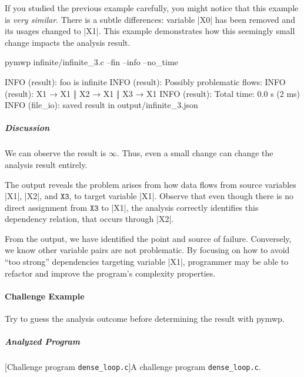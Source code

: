 If you studied the previous example carefully, you might notice that this example is \emph{very similar}.
There is a subtle differences: variable \pr|X0| has been removed and its usages changed to \pr|X1|.
This example demonstrates how this seemingly small change impacts the analysis result.

\begin{cmdlisting}[label={lst:ex4-run-cmd}]
pymwp infinite/infinite_3.c --fin --info --no_time
\end{cmdlisting}

\begin{outlisting}[label={lst:ex4-output}]
INFO (result): foo is infinite
INFO (result): Possibly problematic flows:
INFO (result): X1 → X1 ‖ X2 → X1 ‖ X3 → X1
INFO (result): Total time: 0.0 s (2 ms)
INFO (file_io): saved result in output/infinite_3.json
\end{outlisting}

\subparagraph*{Discussion}

We can observe the result is \(\infty\).
Thus, even a small change can change the analysis result entirely.

The output reveals the problem arises from how data flows from source variables \pr|X1|, \pr|X2|, and \(\texttt{X3}\), to target variable \pr|X1|.
Observe that even though there is no direct assignment from \(\texttt{X3}\) to \pr|X1|, the analysis correctly identifies this dependency relation, that occurs through \pr|X2|.

From the output, we have identified the point and source of failure.
Conversely, we know other variable pairs are not problematic.
By focusing on how to avoid \enquote{too strong} dependencies targeting variable \pr|X1|, programmer may be able to refactor and improve the program's complexity properties.

\paragraph{Challenge Example}\label{challenge-example}
Try to guess the analysis outcome before determining the result with pymwp.

\subparagraph*{Analyzed Program}

\begin{center}
\begin{minipage}{\textwidth}
[Challenge program \texttt{dense\_loop.c}]{A challenge program \texttt{dense\_loop.c}.}
\label{lst:challange}
\end{minipage}
\end{center}

